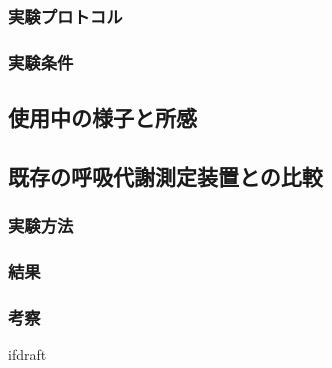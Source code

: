 \subsubsection{実験プロトコル}

\subsubsection{実験条件}

\subsection{使用中の様子と所感}

\subsection{既存の呼吸代謝測定装置との比較}

\subsubsection{実験方法}

\subsubsection{結果}

\subsubsection{考察}

\expandafter\ifx\csname ifdraft\endcsname\relax
  
\fi

